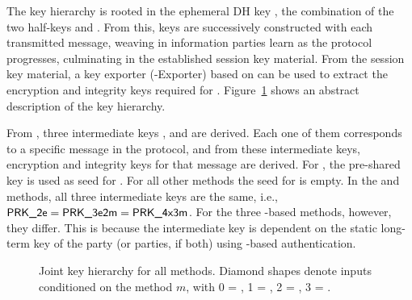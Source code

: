 The key hierarchy is rooted in the ephemeral DH key \mGxy{}, the combination of the two half-keys \mGx{} and \mGy{}.
%
From this, keys are successively constructed with each transmitted message, weaving in information parties learn as the protocol progresses, culminating in the established session key material.
%
From the session key material, a key exporter (\mEdhoc-Exporter) based on \mHkdf{} can be used to extract the encryption and integrity keys required for \mOscore{}.
%
Figure~\ref{fig:kdfdiagram} shows an abstract description of the key hierarchy.
%

From \mGxy{}, three intermediate keys \mPRKtwo, \mPRKthree{} and
\mPRKthree{} are derived.
%
Each one of them corresponds to a specific message in the protocol, and from these intermediate keys, encryption and integrity keys for that message are derived.
%
For \mPskPsk{}, the pre-shared key is used as seed for \mPRKtwo. For all other methods the seed for \mPRKtwo{} is empty.
%
In the \mPskPsk{} and \mSigSig{} methods, all three intermediate keys
are the same, i.e., $\textsf{PRK\_2e}{} = \textsf{PRK\_3e2m}{} = \textsf{PRK\_4x3m}$.
%
For the three \mStat-based methods, however, they differ. This is because the intermediate key \mPRKthree{} is dependent on the static long-term key of the party (or parties, if both) using \mStat{}-based authentication.
%


%


\begin{figure}
\scalebox{.75}{

}
\caption{Joint key hierarchy for all methods. Diamond shapes denote inputs conditioned on the method $m$, with 0 = \mSigSig, 1 = \mSigStat, 2 = \mStatSig, 3 = \mStatStat.}
\label{fig:kdfdiagram}
\end{figure}

